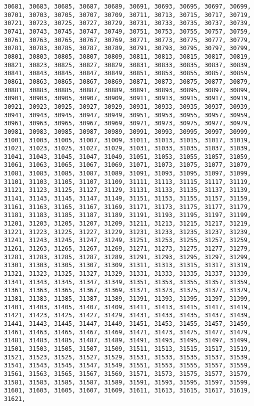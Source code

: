 \documentclass[11pt]{article}
\begin{document}
\begin{Verbatim}[commandchars=\\\{\}]
30681, 30683, 30685, 30687, 30689, 30691, 30693, 30695, 30697, 30699, 30701, 30703, 30705, 30707, 30709, 30711, 30713, 30715, 30717, 30719, 30721, 30723, 30725, 30727, 30729, 30731, 30733, 30735, 30737, 30739, 30741, 30743, 30745, 30747, 30749, 30751, 30753, 30755, 30757, 30759, 30761, 30763, 30765, 30767, 30769, 30771, 30773, 30775, 30777, 30779, 30781, 30783, 30785, 30787, 30789, 30791, 30793, 30795, 30797, 30799, 30801, 30803, 30805, 30807, 30809, 30811, 30813, 30815, 30817, 30819, 30821, 30823, 30825, 30827, 30829, 30831, 30833, 30835, 30837, 30839, 30841, 30843, 30845, 30847, 30849, 30851, 30853, 30855, 30857, 30859, 30861, 30863, 30865, 30867, 30869, 30871, 30873, 30875, 30877, 30879, 30881, 30883, 30885, 30887, 30889, 30891, 30893, 30895, 30897, 30899, 30901, 30903, 30905, 30907, 30909, 30911, 30913, 30915, 30917, 30919, 30921, 30923, 30925, 30927, 30929, 30931, 30933, 30935, 30937, 30939, 30941, 30943, 30945, 30947, 30949, 30951, 30953, 30955, 30957, 30959, 30961, 30963, 30965, 30967, 30969, 30971, 30973, 30975, 30977, 30979, 30981, 30983, 30985, 30987, 30989, 30991, 30993, 30995, 30997, 30999, 31001, 31003, 31005, 31007, 31009, 31011, 31013, 31015, 31017, 31019, 31021, 31023, 31025, 31027, 31029, 31031, 31033, 31035, 31037, 31039, 31041, 31043, 31045, 31047, 31049, 31051, 31053, 31055, 31057, 31059, 31061, 31063, 31065, 31067, 31069, 31071, 31073, 31075, 31077, 31079, 31081, 31083, 31085, 31087, 31089, 31091, 31093, 31095, 31097, 31099, 31101, 31103, 31105, 31107, 31109, 31111, 31113, 31115, 31117, 31119, 31121, 31123, 31125, 31127, 31129, 31131, 31133, 31135, 31137, 31139, 31141, 31143, 31145, 31147, 31149, 31151, 31153, 31155, 31157, 31159, 31161, 31163, 31165, 31167, 31169, 31171, 31173, 31175, 31177, 31179, 31181, 31183, 31185, 31187, 31189, 31191, 31193, 31195, 31197, 31199, 31201, 31203, 31205, 31207, 31209, 31211, 31213, 31215, 31217, 31219, 31221, 31223, 31225, 31227, 31229, 31231, 31233, 31235, 31237, 31239, 31241, 31243, 31245, 31247, 31249, 31251, 31253, 31255, 31257, 31259, 31261, 31263, 31265, 31267, 31269, 31271, 31273, 31275, 31277, 31279, 31281, 31283, 31285, 31287, 31289, 31291, 31293, 31295, 31297, 31299, 31301, 31303, 31305, 31307, 31309, 31311, 31313, 31315, 31317, 31319, 31321, 31323, 31325, 31327, 31329, 31331, 31333, 31335, 31337, 31339, 31341, 31343, 31345, 31347, 31349, 31351, 31353, 31355, 31357, 31359, 31361, 31363, 31365, 31367, 31369, 31371, 31373, 31375, 31377, 31379, 31381, 31383, 31385, 31387, 31389, 31391, 31393, 31395, 31397, 31399, 31401, 31403, 31405, 31407, 31409, 31411, 31413, 31415, 31417, 31419, 31421, 31423, 31425, 31427, 31429, 31431, 31433, 31435, 31437, 31439, 31441, 31443, 31445, 31447, 31449, 31451, 31453, 31455, 31457, 31459, 31461, 31463, 31465, 31467, 31469, 31471, 31473, 31475, 31477, 31479, 31481, 31483, 31485, 31487, 31489, 31491, 31493, 31495, 31497, 31499, 31501, 31503, 31505, 31507, 31509, 31511, 31513, 31515, 31517, 31519, 31521, 31523, 31525, 31527, 31529, 31531, 31533, 31535, 31537, 31539, 31541, 31543, 31545, 31547, 31549, 31551, 31553, 31555, 31557, 31559, 31561, 31563, 31565, 31567, 31569, 31571, 31573, 31575, 31577, 31579, 31581, 31583, 31585, 31587, 31589, 31591, 31593, 31595, 31597, 31599, 31601, 31603, 31605, 31607, 31609, 31611, 31613, 31615, 31617, 31619, 31621, 
\end{Verbatim}
\end{document}
